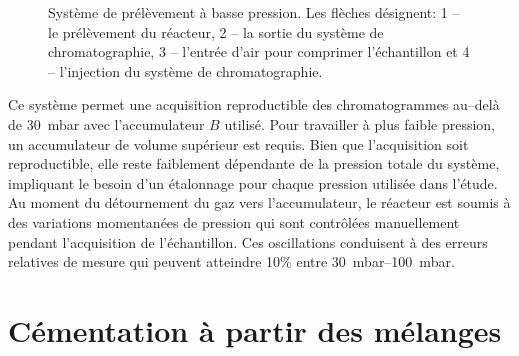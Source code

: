 \begin{figure}[h]
  \centering{}
  
  \caption{\label{fig:systeme_bp}Système de prélèvement à basse pression. Les flèches désignent: 1 -- le prélèvement du réacteur, 2 -- la sortie du système de chromatographie, 3 -- l'entrée d'air pour comprimer l'échantillon et 4 -- l'injection du système de chromatographie.}
\end{figure}

Ce système permet une acquisition reproductible des chromatogrammes au--delà de \SI{30}{\milli\bar} avec l'accumulateur \og{}$B$\fg{} utilisé. Pour travailler à plus faible pression, un accumulateur de volume supérieur est requis. Bien que l'acquisition soit reproductible, elle reste faiblement dépendante de la pression totale du système, impliquant le besoin d'un étalonnage pour chaque pression utilisée dans l'étude. Au moment du détournement du gaz vers l'accumulateur, le réacteur est soumis à des variations momentanées de pression qui sont contrôlées manuellement pendant l'acquisition de l'échantillon. Ces oscillations conduisent à des erreurs relatives de mesure qui peuvent atteindre 10\% entre \SIrange{30}{100}{\milli\bar}. %

\section{Cémentation à partir des mélanges }
\label{sec:classical_carburizing}

